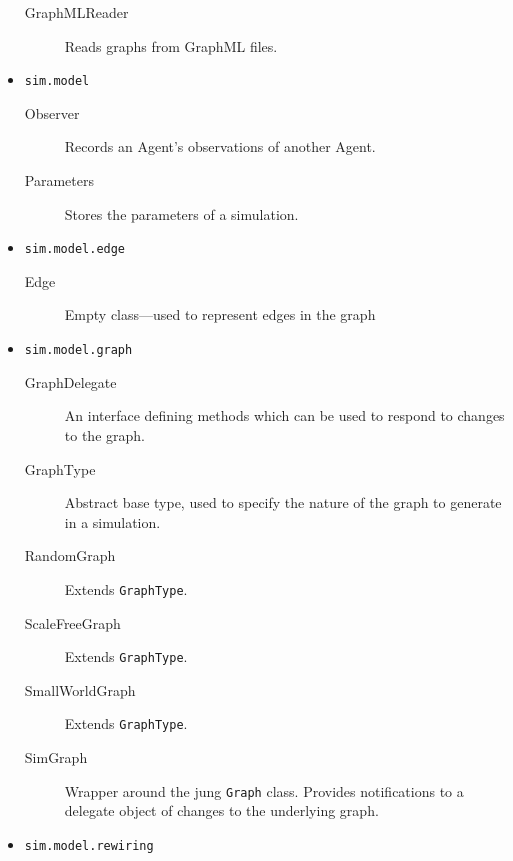 \begin{itemize}
    \begin{description}
        \item[GraphMLReader] Reads graphs from GraphML files.
    \end{description}

    \item {\tt sim.model}

    \begin{description}
        \item[Observer] Records an Agent's observations of another
        Agent.
        \item[Parameters] Stores the parameters of a simulation.
    \end{description}

    \item {\tt sim.model.edge}

    \begin{description}
        \item[Edge] Empty class---used to represent edges in the graph
    \end{description}

    \item {\tt sim.model.graph}

    \begin{description}
        \item[GraphDelegate] An interface defining methods which can be
        used to respond to changes to the graph.
        \item[GraphType] Abstract base type, used to specify the nature
        of the graph to generate in a simulation.
        \item[RandomGraph] Extends {\tt GraphType}.
        \item[ScaleFreeGraph] Extends {\tt GraphType}.
        \item[SmallWorldGraph] Extends {\tt GraphType}.
        \item[SimGraph] Wrapper around the {\sc jung} {\tt Graph} class.
        Provides notifications to a delegate object of changes to the
        underlying graph.
    \end{description}

    \item {\tt sim.model.rewiring}


\end{itemize}
